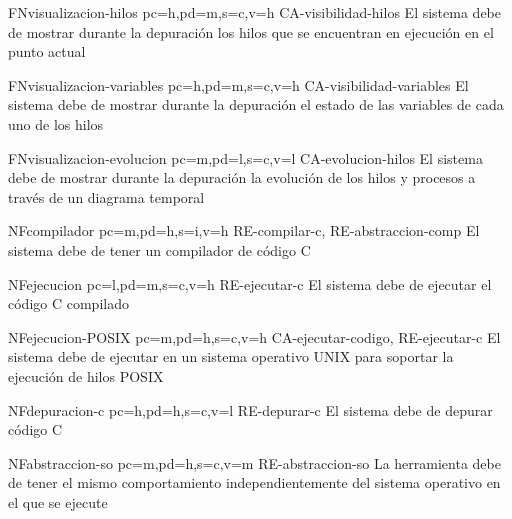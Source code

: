 \begin{softwareReq}{FN}{visualizacion-hilos}
    {pc=h,pd=m,s=c,v=h}
    {CA-visibilidad-hilos}
    El sistema debe de mostrar durante la depuración los \glspl{hilo} que se encuentran en ejecución en el punto actual
\end{softwareReq}

\begin{softwareReq}{FN}{visualizacion-variables}
    {pc=h,pd=m,s=c,v=h}
    {CA-visibilidad-variables}
    El sistema debe de mostrar durante la depuración el estado de las variables de cada uno de los \glspl{hilo}
\end{softwareReq}   

\begin{softwareReq}{FN}{visualizacion-evolucion}
    {pc=m,pd=l,s=c,v=l}
    {CA-evolucion-hilos}
    El sistema debe de mostrar durante la depuración la evolución de los \glspl{hilo} y procesos a través de un diagrama temporal
\end{softwareReq}

\begin{softwareReq}{NF}{compilador}
    {pc=m,pd=h,s=i,v=h}
    {RE-compilar-c, RE-abstraccion-comp}
    El sistema debe de tener un compilador de código C
\end{softwareReq}

\begin{softwareReq}{NF}{ejecucion}
    {pc=l,pd=m,s=c,v=h}
    {RE-ejecutar-c}
    El sistema debe de ejecutar el código C compilado
\end{softwareReq}

\begin{softwareReq}{NF}{ejecucion-POSIX}
    {pc=m,pd=h,s=c,v=h}
    {CA-ejecutar-codigo, RE-ejecutar-c}
    El sistema debe de ejecutar en un sistema operativo UNIX para soportar la ejecución de \glspl{hilo} POSIX 
\end{softwareReq}

\begin{softwareReq}{NF}{depuracion-c}
    {pc=h,pd=h,s=c,v=l}
    {RE-depurar-c}
    El sistema debe de \gls{depurar} código C
\end{softwareReq}

\begin{softwareReq}{NF}{abstraccion-so}
    {pc=m,pd=h,s=c,v=m}
    {RE-abstraccion-so}
    La herramienta debe de tener el mismo comportamiento independientemente del sistema operativo en el que se ejecute
\end{softwareReq}

